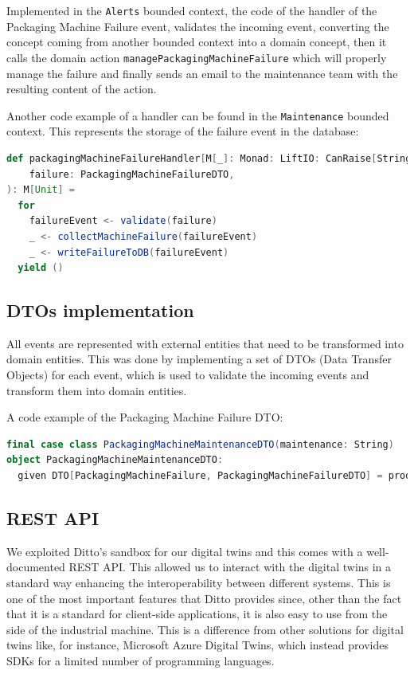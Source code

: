 Implemented in the \texttt{Alerts} bounded context, the code of the handler of the Packaging Machine Failure event, validates the incoming event, converting the concept coming from another bounded context into a domain concept, then it calls the domain action \texttt{managePackagingMachineFailure} which will properly manage the failure and finally sends an email to the maintenance team with the resulting content of the action.

Another code example of a handler can be found in the \texttt{Maintenance} bounded context.
This represents the storage of the failure event in the database:

\begin{lstlisting}[language=Scala]
def packagingMachineFailureHandler[M[_]: Monad: LiftIO: CanRaise[String]](
    failure: PackagingMachineFailureDTO,
): M[Unit] =
  for
    failureEvent <- validate(failure)
    _ <- collectMachineFailure(failureEvent)
    _ <- writeFailureToDB(failureEvent)
  yield ()
\end{lstlisting}

\newpage

\subsection{DTOs implementation}
All events are represented with external entities that need to be transformed into domain entities.
This was done by implementing a set of DTOs (Data Transfer Objects) for each event, which is used to validate the incoming events and transform them into domain entities.

A code example of the Packaging Machine Failure DTO:

\begin{lstlisting}[language=Scala]
final case class PackagingMachineMaintenanceDTO(maintenance: String)
object PackagingMachineMaintenanceDTO:
  given DTO[PackagingMachineFailure, PackagingMachineFailureDTO] = productTypeDTO

\end{lstlisting}

\subsection{REST API}
We exploited Ditto's sandbox for our digital twins and this comes with a well-documented REST API.
This allowed us to interact with the digital twins in a standard way enhancing the interoperability between different systems.
This is one of the most important features that Ditto provides since, other than the fact that it is a standard for client-side applications, it is also easy to use from the side of the industrial machine.
This is a difference from other solutions for digital twins like, for instance, Microsoft Azure Digital Twins, which instead provides SDKs for a limited number of programming languages.
